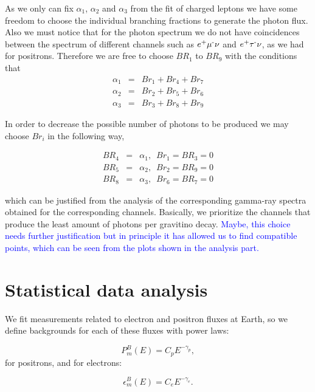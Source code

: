 \documentclass[a4paper,11pt]{article}
\newcommand*{\blue}{\textcolor{blue}}
\begin{document}
As we only can fix $\alpha_{1}$, $\alpha_{2}$ and $\alpha_{3}$ from the fit of charged leptons we have some freedom to choose the
individual branching fractions to generate the photon flux. Also we must notice that for the photon spectrum we do not have coincidences
between the spectrum of different channels such as $e\text{\textsuperscript{+}}\mu\text{\textsuperscript{-}}\nu$
and $e\text{\textsuperscript{+}}\tau\text{\textsuperscript{-}}\nu$,
as we had for positrons. Therefore we are free to choose $BR{}_{1}$
to $BR_{9}$ with the conditions that
\begin{eqnarray*}
\alpha_{1} & = & Br_{1}+Br_{4}+Br_{7}\\
\alpha_{2} & = & Br_{2}+Br_{5}+Br_{6}\\
\alpha_{3} & = & Br_{3}+Br_{8}+Br_{9}
\end{eqnarray*}


In order to decrease the possible number of photons to be produced we may choose $Br_{i}$ in the following way,

\begin{eqnarray*}
BR_{4} & = & \alpha_{1},\,\,\,Br_{1}=BR_{3}=0\\
BR_{5} & = & \alpha_{2},\,\,\,Br_{2}=BR_{9}=0\\
BR_{8} & = & \alpha_{3},\,\,\,Br_{6}=BR_{7}=0
\end{eqnarray*}

\noindent which can be justified from the analysis of the corresponding gamma-ray spectra obtained for the corresponding channels. Basically,
we prioritize the channels that produce the least amount of photons per gravitino decay. \blue{Maybe, this choice needs further justification but in principle it has allowed us to find compatible points, which can be seen from the plots shown in the analysis part.} 

\section{Statistical data analysis}

We fit measurements related to electron and positron fluxes at Earth, so we define backgrounds for each of these fluxes with power laws:

\begin{equation}
P_m^B(E) = C_p E^{-\gamma_p}, 
\end{equation}
for positrons, and for electrons:

\begin{equation}
\epsilon_m^B(E) = C_e E^{-\gamma_e}.
\end{equation}
\end{document}
